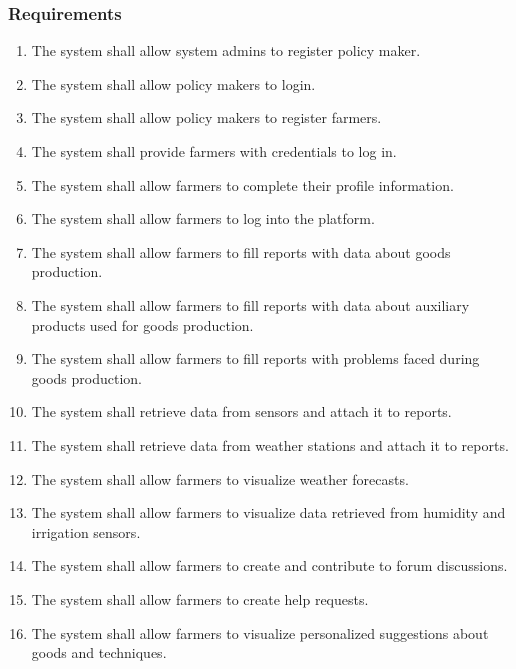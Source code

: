 \documentclass[10pt]{article}
\begin{document}
\subsubsection{Requirements}
\begin{enumerate}[label=\textbf{R\arabic*}]
    \item \label{req:pmReg} The system shall allow system admins to register policy maker.    
    \item \label{req:pmLogin} The system shall allow policy makers to login.    
    \item \label{req:farmerReg1} The system shall allow policy makers to register farmers.    
    \item \label{req:farmerCreds} The system shall provide farmers with credentials to log in.    
    \item \label{req:farmerReg2} The system shall allow farmers to complete their profile information.    
    \item \label{req:farmerLogin} The system shall allow farmers to log into the platform.      
    \item \label{req:farmerReport1} The system shall allow farmers to fill reports with data about goods production.    
    \item \label{req:farmerReport2} The system shall allow farmers to fill reports with data about auxiliary products used for goods production.    
    \item \label{req:farmerReport3} The system shall allow farmers to fill reports with problems faced during goods production.     
    \item \label{req:farmerReport4} The system shall retrieve data from sensors and attach it to reports.     
    \item \label{req:farmerReport5} The system shall retrieve data from weather stations and attach it to reports.     
    \item \label{req:farmerWeather} The system shall allow farmers to visualize weather forecasts.
    \item \label{req:farmerSensors} The system shall allow farmers to visualize data retrieved from humidity and irrigation sensors.
    \item \label{req:farmerForum} The system shall allow farmers to create and contribute to forum discussions.    
    \item \label{req:farmerHelp} The system shall allow farmers to create help requests.     
    \item \label{req:farmerSugg} The system shall allow farmers to visualize personalized suggestions about goods and techniques.    

\end{enumerate}
\end{document}
